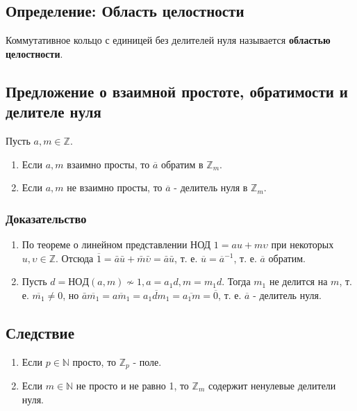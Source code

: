 \documentclass{article}
\newcommand{\cgcd}{\mathrm{НОД}}
\begin{document}
\subsection{Определение: Область целостности}
Коммутативное кольцо с единицей без делителей нуля называется \textbf{областью целостности}.

\subsection{Предложение о взаимной простоте, обратимости и делителе нуля}
Пусть $a, m \in \mathbb{Z}$.
\begin{enumerate}
\item Если $a, m$ взаимно просты, то $\overline a$ обратим в $\mathbb Z_m$.
\item Если $a, m$ не взаимно просты, то $\overline a$ - делитель нуля в $\mathbb Z_m$.
\end{enumerate}

\subsubsection*{Доказательство}
\begin{enumerate}
\item По теореме о линейном представлении НОД $1 = au + m\upsilon$ при некоторых $u, \upsilon \in \mathbb Z$. Отсюда $\overline 1 = \bar a \bar u + \bar m \bar \upsilon = \bar a \bar u$, т. е. $\overline u = \overline a^{-1}$, т. е. $\overline a$ обратим.
\item Пусть $d = \cgcd(a, m) \not \sim 1, a = a_1d, m = m_1d$. Тогда $m_1$ не делится на $m$, т. е. $\overline{m_1} \neq 0$, но $\bar a \overline{m_1} = \overline{am_1} = \overline{a_1dm_1} = \overline{a_1m} = \overline{0}$, т. е. $\overline a$ - делитель нуля.
\end{enumerate}

\subsection{Следствие}
\begin{enumerate}
\item Если $p \in \mathbb N$ просто, то $\mathbb Z_p$ - поле.
\item Если $m \in \mathbb N$ не просто и не равно 1, то $\mathbb Z_m$ содержит ненулевые делители нуля.
\end{enumerate}
\end{document}
